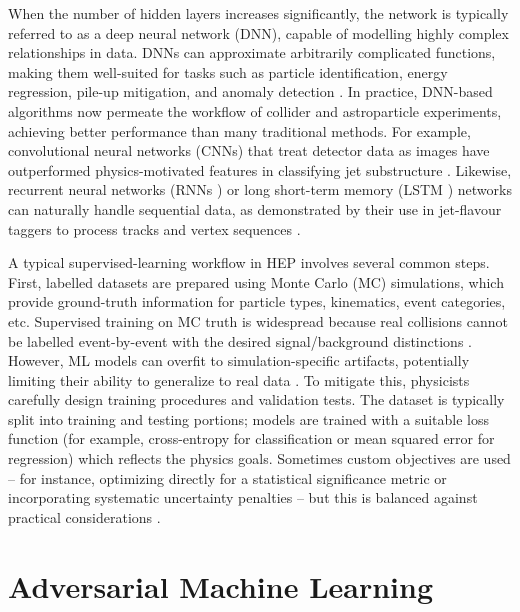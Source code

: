 When the number of hidden layers increases significantly, the network is typically referred to as a deep neural network (DNN), capable of modelling highly complex relationships in data. DNNs can approximate arbitrarily complicated functions, making them well-suited for tasks such as particle identification, energy regression, pile-up mitigation, and anomaly detection \cite{Khalaf:2025grv}. In practice, DNN-based algorithms now permeate the workflow of collider and astroparticle experiments, achieving better performance than many traditional methods. For example, convolutional neural networks (CNNs) that treat detector data as images have outperformed physics-motivated features in classifying jet substructure \cite{de_Oliveira_2016}. Likewise, recurrent neural networks (RNNs \cite{Goodfellow-et-al-2016}) or long short-term memory (LSTM \cite{Goodfellow-et-al-2016}) networks can naturally handle sequential data, as demonstrated by their use in jet-flavour taggers to process tracks and vertex sequences \cite{Bols_2020}.

A typical supervised-learning workflow in HEP involves several common steps. First, labelled datasets are prepared using Monte Carlo (MC) simulations, which provide ground-truth information for particle types, kinematics, event categories, etc. Supervised training on MC truth is widespread because real collisions cannot be labelled event-by-event with the desired signal/background distinctions \cite{PhysRevD.112.016004}. However, ML models can overfit to simulation-specific artifacts, potentially limiting their ability to generalize to real data \cite{PhysRevD.112.016004}. To mitigate this, physicists carefully design training procedures and validation tests. The dataset is typically split into training and testing portions; models are trained with a suitable loss function (for example, cross-entropy for classification or mean squared error for regression) which reflects the physics goals. Sometimes custom objectives are used – for instance, optimizing directly for a statistical significance metric or incorporating systematic uncertainty penalties – but this is balanced against practical considerations  \cite{Bardhan:2024ibw}.

\section{Adversarial Machine Learning}

